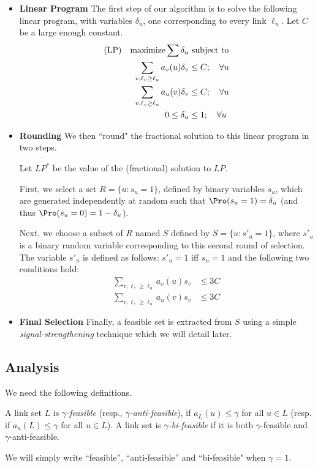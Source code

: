 \documentclass[11pt]{amsart}
\begin{document}
\begin{itemize}
\item {\bf Linear Program}
The first step of our algorithm is to solve the following linear program, with variables $\delta_u$, one corresponding to 
every link $\ell_u$.
Let $C$ be a large enough constant.
\begin{align}
\text{(LP)\quad maximize} \sum \delta_u &  \text{ subject to} \nonumber\\
\sum_{v, \ell_v \geq \ell_u} a_v(u) \delta_v & \leq C; \quad \forall u \label{lpcond1}\\
\sum_{v, \ell_v \geq \ell_u} a_u(v) \delta_v & \leq C; \quad \forall u \label{lpcond2}\\
0 \le \delta_u & \le 1; \quad \forall u  \label{lpcond3}
\end{align}

\item {\bf Rounding}
We then ``round" the fractional solution to this linear program in two steps.

Let $LP^*$ be the value of the (fractional) solution to $LP$.

First, we select a set $R = \{u: s_u = 1\}$, defined by binary variables $s_u$, which are generated independently at random such that $\Pro(s_u = 1) = \delta_u$ (and thus $\Pro(s_u = 0) = 1 - \delta_u$). 

Next, we choose a subset of $R$ named $S$ defined by $S = \{u : s'_u = 1\}$,
where $s'_u$ is a binary random variable
corresponding to this second round of selection.
The variable $s'_u$ is defined as follows:
$s'_u = 1$ iff $s_u = 1$ and the following two conditions hold:
\begin{align}
\sum_{v, \ell_v \geq \ell_u} a_v(u) s_v & \leq 3 C \label{rndcond1}\\
\sum_{v, \ell_v \geq \ell_u}a_u(v) s_v  & \leq 3 C \label{rndcond2}
\end{align}

\item {\bf Final Selection}
Finally, a feasible set is extracted from $S$ using a simple \emph{signal-strengthening} technique which we will detail later.
\end{itemize}

\subsection{Analysis}
We need the following definitions.
\begin{defn}
A link set $L$ is \emph{$\gamma$-feasible} (resp., \emph{$\gamma$-anti-feasible}), if $a_L(u) \leq \gamma$ for all $u \in L$ (resp. if $a_{u}(L) \leq \gamma$ for all $u \in L$). A link set is \emph{$\gamma$-bi-feasible} if it is both $\gamma$-feasible and $\gamma$-anti-feasible.
\end{defn}
We will simply write ``feasible'', ``anti-feasible'' and ``bi-feasible" when $\gamma = 1$.
\end{document}
